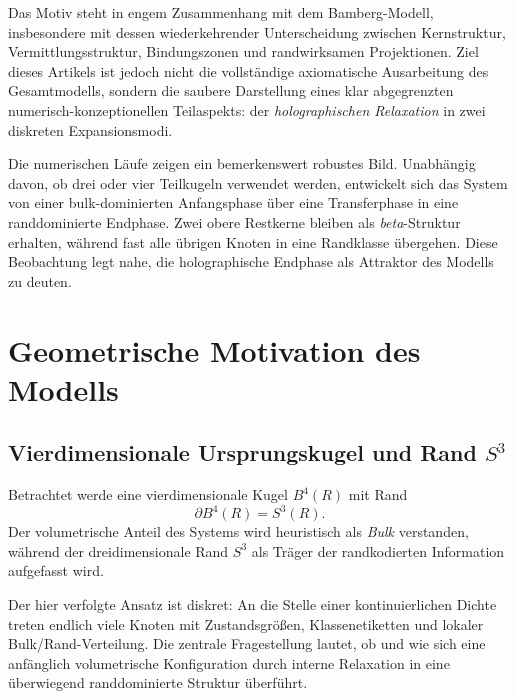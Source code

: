 \documentclass[11pt,a4paper]{article}
\theoremstyle{definition}
\theoremstyle{remark}
\begin{document}
	Das Motiv steht in engem Zusammenhang mit dem Bamberg-Modell, insbesondere mit dessen wiederkehrender Unterscheidung zwischen Kernstruktur, Vermittlungsstruktur, Bindungszonen und randwirksamen Projektionen. Ziel dieses Artikels ist jedoch nicht die vollständige axiomatische Ausarbeitung des Gesamtmodells, sondern die saubere Darstellung eines klar abgegrenzten numerisch-konzeptionellen Teilaspekts: der \emph{holographischen Relaxation} in zwei diskreten Expansionsmodi.
	
	Die numerischen Läufe zeigen ein bemerkenswert robustes Bild. Unabhängig davon, ob drei oder vier Teilkugeln verwendet werden, entwickelt sich das System von einer bulk-dominierten Anfangsphase über eine Transferphase in eine randdominierte Endphase. Zwei obere Restkerne bleiben als \emph{beta}-Struktur erhalten, während fast alle übrigen Knoten in eine Randklasse übergehen. Diese Beobachtung legt nahe, die holographische Endphase als Attraktor des Modells zu deuten.
	
	\section{Geometrische Motivation des Modells}
	\subsection{Vierdimensionale Ursprungskugel und Rand $S^3$}
	Betrachtet werde eine vierdimensionale Kugel $B^4(R)$ mit Rand
	\[
	\partial B^4(R)=S^3(R).
	\]
	Der volumetrische Anteil des Systems wird heuristisch als \emph{Bulk} verstanden, während der dreidimensionale Rand $S^3$ als Träger der randkodierten Information aufgefasst wird.
	
	Der hier verfolgte Ansatz ist diskret: An die Stelle einer kontinuierlichen Dichte treten endlich viele Knoten mit Zustandsgrößen, Klassenetiketten und lokaler Bulk/Rand-Verteilung. Die zentrale Fragestellung lautet, ob und wie sich eine anfänglich volumetrische Konfiguration durch interne Relaxation in eine überwiegend randdominierte Struktur überführt.
	
\end{document}
